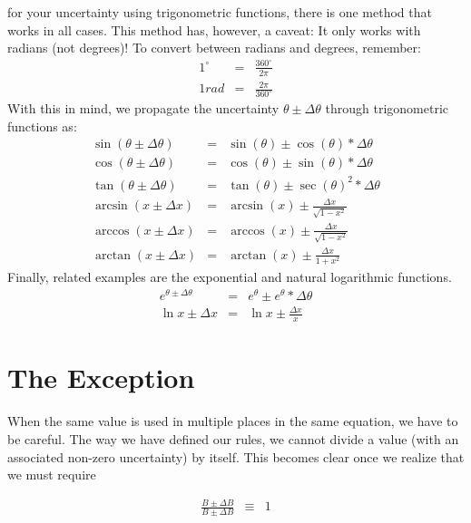 		 for your uncertainty using trigonometric functions, there is one method that works in all cases.  This method has, however, a caveat: It only works with radians (not degrees)!  To convert between radians and degrees, remember:
		\begin{eqnarray*}
			1^{\circ}&=&\frac{360^{\circ}}{2\pi}\\
			1 rad&=&\frac{2\pi}{360^{\circ}}
		\end{eqnarray*}
		With this in mind, we propagate the uncertainty $\theta\pm\Delta{\theta}$ through trigonometric functions as:
		 \begin{eqnarray*}
		 	\sin\left(\theta\pm\Delta\theta\right)&=&\sin\left(\theta\right)\pm\cos\left(\theta\right)*\Delta\theta\\
			\cos\left(\theta\pm\Delta\theta\right)&=&\cos\left(\theta\right)\pm\sin\left(\theta\right)*\Delta\theta\\
			\tan\left(\theta\pm\Delta\theta\right)&=&\tan\left(\theta\right)\pm\sec\left(\theta\right)^{2}*\Delta\theta\\
			\arcsin\left(x\pm\Delta x\right)&=&\arcsin\left(x\right)\pm\frac{\Delta{x}}{\sqrt{1-x^{2}}}\\
			\arccos\left(x\pm\Delta x\right)&=&\arccos\left(x\right)\pm\frac{\Delta{x}}{\sqrt{1-x^{2}}}\\
			\arctan\left(x\pm\Delta x\right)&=&\arctan\left(x\right)\pm\frac{\Delta x}{1+x^{2}}		\end{eqnarray*}
		Finally, related examples are the exponential and natural logarithmic functions.
		\begin{eqnarray*}
			e^{\theta\pm\Delta\theta}&=&e^{\theta}\pm e^{\theta}*\Delta\theta\\
			\ln{x\pm\Delta x}&=&\ln{x}\pm\frac{\Delta x}{x}
		\end{eqnarray*}
\section{The Exception}

	When the same value is used in multiple places in the same equation, we have to be careful. The way we have defined our rules, we cannot divide a value (with an associated non-zero uncertainty) by itself. This becomes clear once we realize that we must require
	
	\begin{eqnarray*}
		\frac{B \pm \Delta B}{B \pm \Delta B}&\equiv&1
	\end{eqnarray*}
	
